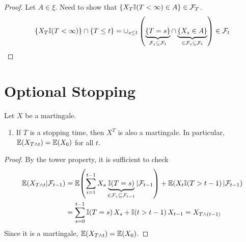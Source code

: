 \begin{proof}
  Let $A \in \xi$.  Need to show that $\{ X_{T} \I{T < \infty} \in A
  \} \in \mathcal{F}_{T}$.
  \begin{align}
    \label{eq:25}
    \{ X_{T} \I{T < \infty} \} \cap \{ T \leq t \} = \cup_{s \leq t}
    \left( \underbrace{\{ T = s \}}_{\mathcal{F}_{s} \subseteq
        \mathcal{F}_{t}} \cap \underbrace{\{ X_{s} \in A \}}_{\in
        \mathcal{F}_{s} \subseteq \mathcal{F}_{t}} \right) \in \mathcal{F}_{t}
  \end{align}
\end{proof}


\section{Optional Stopping}
\label{sec:optional-stopping}

\begin{thm}
  \label{defn:discrete_time_martingales:6}
  Let $X$ be a martingale.
  \begin{enumerate}
  \item If $T$ is a stopping time, then $X^{T}$ is also a martingale.
    In particular, $\E{X_{T \wedge t}} = \E{X_{0}}$ for all $t$.
  \end{enumerate}
\end{thm}

\begin{proof}
  By the tower property, it is sufficient to check
  \begin{align*}
    \label{eq:26}
    \E{X_{T \wedge t} | \mathcal{F}_{t - 1}} &= 
    \E{\sum_{i=1}^{t-1} X_{s} \underbrace{\I{T=s}}_{\in
        \mathcal{F}_{s} \subseteq \mathcal{F}_{t-1}}  |
      \mathcal{F}_{t-1}} + \E{X_{t} \I{T > t -1} | \mathcal{F}_{t-1}}
    \\
    &= \sum_{s=0}^{t-1} \I{T=s} X_{s} + \I{t>t-1}X_{t-1} = X_{T \wedge (t-1)}
  \end{align*}  Since it is a martingale, $\E{X_{T \wedge t}} = \E{X_{0}}$.
\end{proof}


